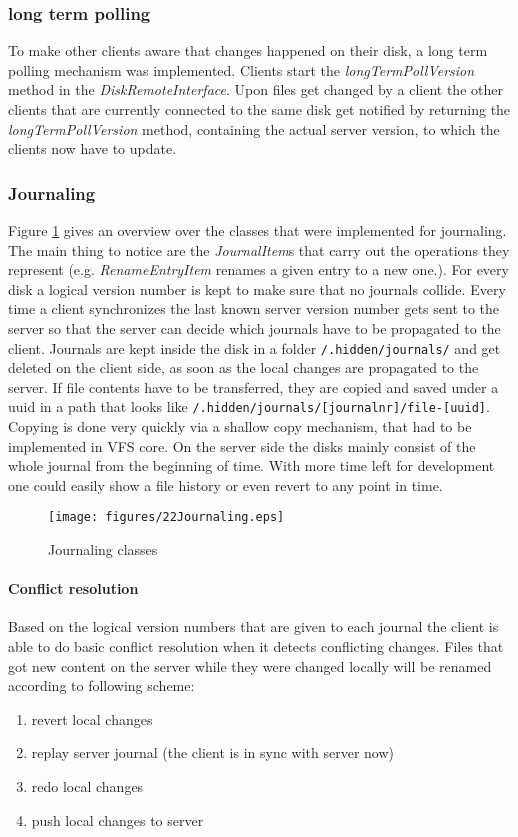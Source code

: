 \subsubsection{long term polling}
To make other clients aware that changes happened on their disk, a long term
polling mechanism was implemented. Clients start the
\textit{longTermPollVersion} method in the \textit{DiskRemoteInterface}. Upon
files get changed by a client the other clients that are currently connected to
the same disk get notified by returning the \textit{longTermPollVersion} method,
containing the actual server version, to which the clients now have to update.

\subsubsection{Journaling}
Figure \ref{fig:journaling_classes} gives an overview over the classes that
were implemented for journaling. The main thing to notice are the
\textit{JournalItem}s that carry out the operations they represent (e.g.
\textit{RenameEntryItem} renames a given entry to a new one.). For every disk a
logical version number is kept to make sure that no journals collide. Every time
a client synchronizes the last known server version number gets sent to the
server so that the server can decide which journals have to be propagated to the
client. Journals are kept inside the disk in a folder \verb|/.hidden/journals/|
and get deleted on the client side, as soon as the local changes are propagated
to the server. If file contents have to be transferred, they are copied and
saved under a uuid in a path that looks like \verb|/.hidden/journals/[journalnr]/file-[uuid]|.
Copying is done very quickly via a shallow copy mechanism, that had to be
implemented in VFS core. On the server side the disks mainly consist of the
whole journal from the beginning of time. With more time left for development
one could easily show a file history or even revert to any point in time.


\begin{figure}[h!]
\centering
\texttt{[image: figures/22Journaling.eps]}
\caption{Journaling classes}
\label{fig:journaling_classes}
\end{figure}

\paragraph{Conflict resolution}
Based on the logical version numbers that are given to each journal the client
is able to do basic conflict resolution when it detects conflicting changes.
Files that got new content on the server while they were changed locally will be
renamed according to following scheme:

\begin{enumerate}
    \item revert local changes
  \item replay server journal (the client is in sync with server now)
  \item redo local changes
  \item push local changes to server
\end{enumerate}
